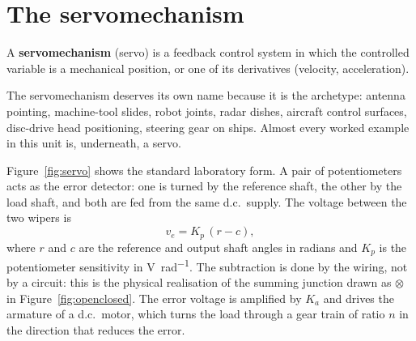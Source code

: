 \documentclass[11pt,a4paper]{article}
\begin{document}
\section{The servomechanism}
\label{sec:servo}

\begin{keyidea}
A \textbf{servomechanism} (servo) is a feedback control system in which the
controlled variable is a mechanical position, or one of its derivatives
(velocity, acceleration).
\end{keyidea}

The servomechanism deserves its own name because it is the archetype: antenna
pointing, machine-tool slides, robot joints, radar dishes, aircraft control
surfaces, disc-drive head positioning, steering gear on ships. Almost every
worked example in this unit is, underneath, a servo.

Figure~\ref{fig:servo} shows the standard laboratory form. A pair of
potentiometers acts as the error detector: one is turned by the reference
shaft, the other by the load shaft, and both are fed from the same d.c.\
supply. The voltage between the two wipers is
\begin{equation}
  v_e = K_p\,(r-c),
  \label{eq:pot}
\end{equation}
where $r$ and $c$ are the reference and output shaft angles in radians and
$K_p$ is the potentiometer sensitivity in \si{\volt\per\radian}. The
subtraction is done by the wiring, not by a circuit: this is the physical
realisation of the summing junction drawn as $\otimes$ in
Figure~\ref{fig:openclosed}. The error voltage is amplified by $K_a$ and drives
the armature of a d.c.\ motor, which turns the load through a gear train of
ratio $n$ in the direction that reduces the error.
\end{document}
